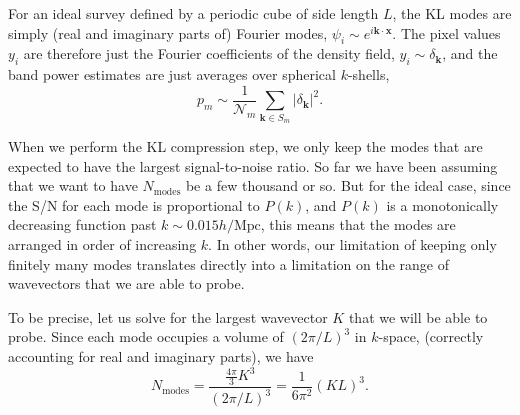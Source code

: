 \documentclass[12pt]{article}
\renewcommand{\vec}[1]{\bm{#1}}
\begin{document}
For an ideal survey defined by a periodic cube of side length $L$, the KL modes
are simply (real and imaginary parts of) Fourier modes,
$\psi_i \sim e^{i\vec{k}\cdot\vec{x}}$.  The pixel values $y_i$ are therefore
just the Fourier coefficients of the density field, $y_i \sim \delta_{\vec{k}}$,
and the band power estimates are just averages over spherical $k$-shells,
\begin{equation}
    p_m \sim \frac{1}{\mathcal{N}_m} \sum_{\vec{k}\in S_m} \left|\delta_{\vec{k}}\right|^2.
\end{equation}

When we perform the KL compression step, we only keep the modes that are
expected to have the largest signal-to-noise ratio.  So far we have been
assuming that we want to have $N_\text{modes}$ be a few thousand or so.  But
for the ideal case, since the S/N for each mode is proportional to $P(k)$, and
$P(k)$ is a monotonically decreasing function past $k \sim 0.015 h/\text{Mpc}$,
this means that the modes are arranged in order of increasing $k$.  In other
words, our limitation of keeping only finitely many modes translates directly
into a limitation on the range of wavevectors that we are able to probe.

To be precise, let us solve for the largest wavevector $K$ that we will be able
to probe.  Since each mode occupies a volume of $(2\pi/L)^3$ in $k$-space,
(correctly accounting for real and imaginary parts), we have
\begin{equation}
    N_\text{modes} = \frac{\tfrac{4\pi}{3} K^3}{(2\pi/L)^3} = \frac{1}{6\pi^2} (KL)^3.
\end{equation}
\end{document}
